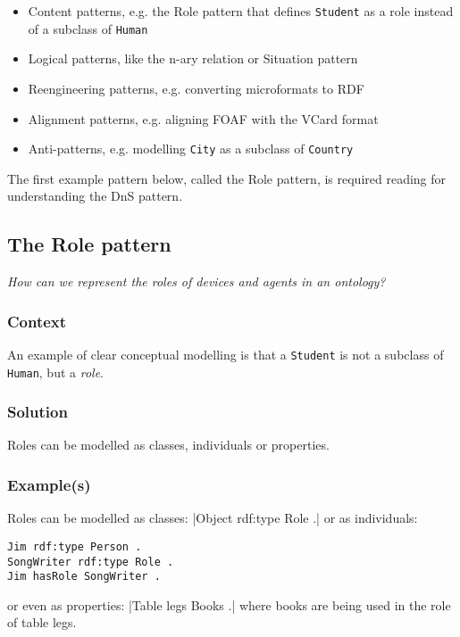 \begin{itemize}
	\item Content patterns, e.g. the Role pattern that defines \texttt{Student} as a role instead of a subclass of \texttt{Human}
	\item Logical patterns, like the n-ary relation or Situation pattern
	\item Reengineering patterns, e.g. converting microformats to \ac{RDF}
	\item Alignment patterns, e.g. aligning \ac{FOAF} with the VCard format
	\item Anti-patterns, e.g. modelling \texttt{City} as a subclass of \texttt{Country}
\end{itemize}

The first example pattern below, called the Role pattern, is required reading for understanding the \ac{DnS} pattern.


\subsection{The Role pattern}\label{Roles}

\emph{How can we represent the roles of devices and agents in an ontology?}

\subsubsection{Context}
An example of clear conceptual modelling\label{ClearConceptualModelling} is that a \texttt{Student} is not a subclass of \texttt{Human}, but a \emph{role}.

\subsubsection{Solution}

Roles can be modelled as classes, individuals or properties.

\subsubsection{Example(s)}

Roles can be modelled as classes: |Object rdf:type Role .| or as individuals: 
\begin{verbatim}
Jim rdf:type Person .
SongWriter rdf:type Role .
Jim hasRole SongWriter .
\end{verbatim}

\noindent
or even as properties: |Table legs Books .| where books are being used in the role of table legs.

